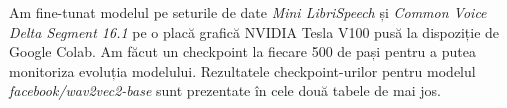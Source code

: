 \par
Am fine-tunat modelul pe seturile de date \textit{Mini LibriSpeech} și \textit{Common Voice Delta Segment 16.1}
pe o placă grafică NVIDIA Tesla V100 pusă la dispoziție de Google Colab. Am făcut un checkpoint la fiecare
500 de pași pentru a putea monitoriza evoluția modelului. Rezultatele checkpoint-urilor pentru modelul
\textit{facebook/wav2vec2-base} sunt prezentate în cele două tabele de mai jos.


